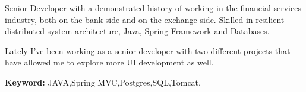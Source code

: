 \documentclass[9pt]{developercv} %
\begin{document}

\begin{minipage}[t]{0.45\textwidth} %
	\vspace{-\baselineskip} %
Senior Developer
 with a demonstrated history of working in the financial services
 industry, both on the bank side and on the exchange side. Skilled in 
resilient distributed system architecture, Java, Spring Framework and Databases.

Lately I've been working as a senior developer with two different projects that have allowed me to explore more UI development as well. 
	  
\textbf{Keyword:} JAVA,Spring MVC,Postgres,SQL,Tomcat.

\end{minipage}
\hfill %
\begin{minipage}[t]{0.47\textwidth} %
	\vspace{-\baselineskip} %
	\begin{barchart}{5.5}
	\end{barchart}
\end{minipage}


\end{document}

